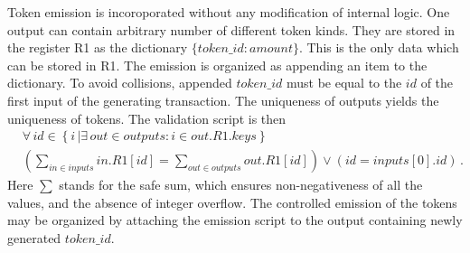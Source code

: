 Token emission is incoroporated without any modification of internal logic. One output can
contain arbitrary number of different token kinds. They are stored in the
register R1 as the dictionary $\{token\_id: amount\}$. This is the only data
which can be stored in R1.  The emission is organized as appending an item to
the dictionary. To avoid collisions, appended $token\_id$ must be equal to the
$id$ of the first input of the generating transaction. The uniqueness of outputs
yields the uniqueness of tokens. The validation script is then
\begin{eqnarray*}
    &\forall\,id\in \left\{ i\, | \exists\, out \in outputs : i\in out.R1.keys
    \right\} \nonumber\\
    &\left(\sum_{in\in inputs} in.R1[id] = \sum_{out\in
    outputs} out.R1[id] \right) \vee \left(id = inputs[0].id\right)\,.
\end{eqnarray*}
Here $\sum$ stands for the safe sum, which ensures non-negativeness of all the
values, and the absence of integer overflow. The controlled emission of the
tokens may be organized by attaching the emission script to the output
containing newly generated $token\_id$.

